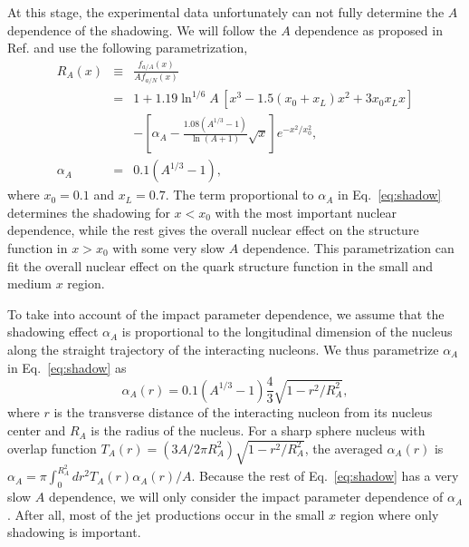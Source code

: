         At this stage, the experimental data unfortunately 
can not fully determine the $A$ dependence of the shadowing. 
We will follow the $A$ dependence as proposed in 
Ref.\cite{shadow2} and use the following parametrization,
\begin{eqnarray}
        R_A(x)&\equiv&\frac{f_{a/A}(x)}{Af_{a/N}(x)} \nonumber\\
                &=&1+1.19\ln^{1/6}\!A\,[x^3-1.5(x_0+x_L)x^2+3x_0x_Lx]\nonumber\\
                & &-[\alpha_A-\frac{1.08(A^{1/3}-1)}{\ln(A+1)}\sqrt{x}]
                        e^{-x^2/x_0^2},\label{eq:shadow}\\
        \alpha_A&=&0.1(A^{1/3}-1),\label{eq:shadow1}
\end{eqnarray}
where $x_0=0.1$ and $x_L=0.7$. The term proportional to $\alpha_A$ in 
Eq.~\ref{eq:shadow} determines the shadowing for $x<x_0$ with the 
most important nuclear dependence, while the rest gives the overall 
nuclear effect on the structure function in $x>x_0$ with some very slow 
$A$ dependence. This parametrization can fit the overall nuclear 
effect on the quark structure function in the small and medium 
$x$ region\cite{hijing}. 


        To take into account of the impact parameter dependence, 
we assume that the shadowing effect $\alpha_A$ is proportional 
to the longitudinal dimension of the nucleus along the straight 
trajectory of the interacting nucleons. We thus parametrize
$\alpha_A$ in Eq.~\ref{eq:shadow} as
\begin{equation}
        \alpha_A(r)=0.1(A^{1/3}-1)\frac{4}{3}\sqrt{1-r^2/R_A^2},
                        \label{eq:rshadow}
\end{equation}
where $r$ is the transverse distance of the interacting 
nucleon from its nucleus center and $R_A$ is the radius of the 
nucleus. For a sharp sphere nucleus with overlap function
$T_A(r)=(3A/2\pi R_A^2)\sqrt{1-r^2/R_A^2}$, the averaged 
$\alpha_A(r)$ is $\alpha_A=\pi\int_0^{R_A^2}dr^2 T_A(r)\alpha_A(r)/A$.
Because the rest of Eq.~\ref{eq:shadow} has a very slow $A$ 
dependence, we will only consider the impact parameter dependence
of $\alpha_A$. After all, most of the jet productions occur in 
the small $x$ region where only shadowing is important.

